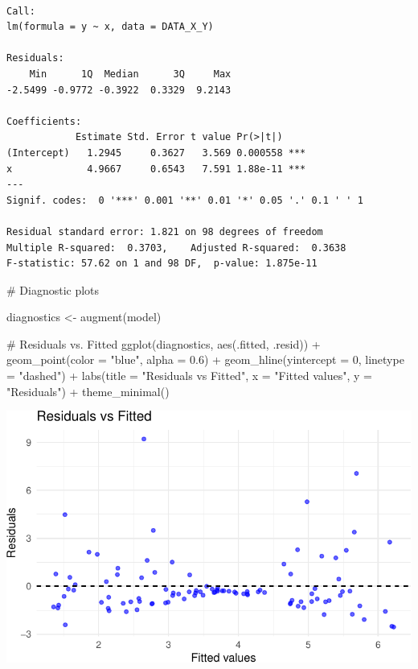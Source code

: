 \documentclass[
  11pt,
]{article}
\newenvironment{Shaded}{\begin{snugshade}}{\end{snugshade}}
\newcommand{\AttributeTok}[1]{\textcolor[rgb]{0.40,0.45,0.13}{#1}}
\newcommand{\CommentTok}[1]{\textcolor[rgb]{0.37,0.37,0.37}{#1}}
\newcommand{\DecValTok}[1]{\textcolor[rgb]{0.68,0.00,0.00}{#1}}
\newcommand{\FloatTok}[1]{\textcolor[rgb]{0.68,0.00,0.00}{#1}}
\newcommand{\FunctionTok}[1]{\textcolor[rgb]{0.28,0.35,0.67}{#1}}
\newcommand{\NormalTok}[1]{\textcolor[rgb]{0.00,0.23,0.31}{#1}}
\newcommand{\OtherTok}[1]{\textcolor[rgb]{0.00,0.23,0.31}{#1}}
\newcommand{\SpecialCharTok}[1]{\textcolor[rgb]{0.37,0.37,0.37}{#1}}
\newcommand{\StringTok}[1]{\textcolor[rgb]{0.13,0.47,0.30}{#1}}
\begin{document}
\begin{verbatim}

Call:
lm(formula = y ~ x, data = DATA_X_Y)

Residuals:
    Min      1Q  Median      3Q     Max 
-2.5499 -0.9772 -0.3922  0.3329  9.2143 

Coefficients:
            Estimate Std. Error t value Pr(>|t|)    
(Intercept)   1.2945     0.3627   3.569 0.000558 ***
x             4.9667     0.6543   7.591 1.88e-11 ***
---
Signif. codes:  0 '***' 0.001 '**' 0.01 '*' 0.05 '.' 0.1 ' ' 1

Residual standard error: 1.821 on 98 degrees of freedom
Multiple R-squared:  0.3703,    Adjusted R-squared:  0.3638 
F-statistic: 57.62 on 1 and 98 DF,  p-value: 1.875e-11
\end{verbatim}

\begin{Shaded}
\begin{Highlighting}[]
\CommentTok{\# Diagnostic plots}

\NormalTok{diagnostics }\OtherTok{\textless{}{-}} \FunctionTok{augment}\NormalTok{(model)}

\CommentTok{\# Residuals vs. Fitted}
\FunctionTok{ggplot}\NormalTok{(diagnostics, }\FunctionTok{aes}\NormalTok{(.fitted, .resid)) }\SpecialCharTok{+}
  \FunctionTok{geom\_point}\NormalTok{(}\AttributeTok{color =} \StringTok{"blue"}\NormalTok{, }\AttributeTok{alpha =} \FloatTok{0.6}\NormalTok{) }\SpecialCharTok{+}
  \FunctionTok{geom\_hline}\NormalTok{(}\AttributeTok{yintercept =} \DecValTok{0}\NormalTok{, }\AttributeTok{linetype =} \StringTok{"dashed"}\NormalTok{) }\SpecialCharTok{+}
  \FunctionTok{labs}\NormalTok{(}\AttributeTok{title =} \StringTok{"Residuals vs Fitted"}\NormalTok{, }\AttributeTok{x =} \StringTok{"Fitted values"}\NormalTok{, }\AttributeTok{y =} \StringTok{"Residuals"}\NormalTok{) }\SpecialCharTok{+}
  \FunctionTok{theme\_minimal}\NormalTok{()}
\end{Highlighting}
\end{Shaded}

\includegraphics{HW-4-CODE-and-ANSWERS_files/figure-pdf/unnamed-chunk-1-1.pdf}
\end{document}

